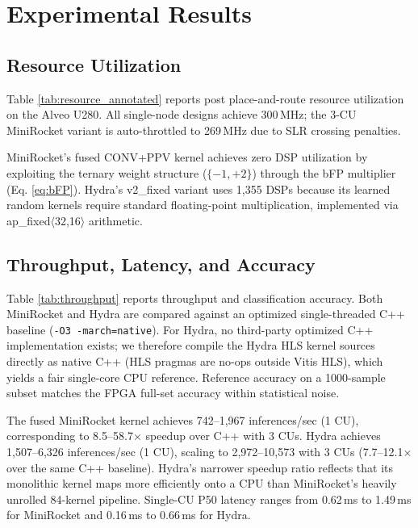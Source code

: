 \section{Experimental Results}
\label{sec:ExpResults}

\subsection{Resource Utilization}
\label{sec:resource_utilization}



Table \ref{tab:resource_annotated} reports post place-and-route resource utilization on the Alveo U280. All single-node designs achieve 300\,MHz; the 3-CU MiniRocket variant is auto-throttled to 269\,MHz due to SLR crossing penalties.

MiniRocket's fused CONV+PPV kernel achieves zero DSP utilization by exploiting the ternary weight structure ($\{-1, +2\}$) through the bFP multiplier (Eq. \ref{eq:bFP}). Hydra's v2\_fixed variant uses 1,355 DSPs because its learned random kernels require standard floating-point multiplication, implemented via ap\_fixed$\langle$32,16$\rangle$ arithmetic.

\subsection{Throughput, Latency, and Accuracy}
\label{sec:single_node_results}



Table \ref{tab:throughput} reports throughput and classification accuracy. Both MiniRocket and Hydra are compared against an optimized single-threaded C++ baseline (\texttt{-O3 -march=native}). For Hydra, no third-party optimized C++ implementation exists; we therefore compile the Hydra HLS kernel sources directly as native C++ (HLS pragmas are no-ops outside Vitis HLS), which yields a fair single-core CPU reference. Reference accuracy on a 1000-sample subset matches the FPGA full-set accuracy within statistical noise.

The fused MiniRocket kernel achieves 742--1,967 inferences/sec (1 CU), corresponding to 8.5--58.7$\times$ speedup over C++ with 3 CUs. Hydra achieves 1,507--6,326 inferences/sec (1 CU), scaling to 2,972--10,573 with 3 CUs (7.7--12.1$\times$ over the same C++ baseline). Hydra's narrower speedup ratio reflects that its monolithic kernel maps more efficiently onto a CPU than MiniRocket's heavily unrolled 84-kernel pipeline. Single-CU P50 latency ranges from 0.62\,ms to 1.49\,ms for MiniRocket and 0.16\,ms to 0.66\,ms for Hydra.

